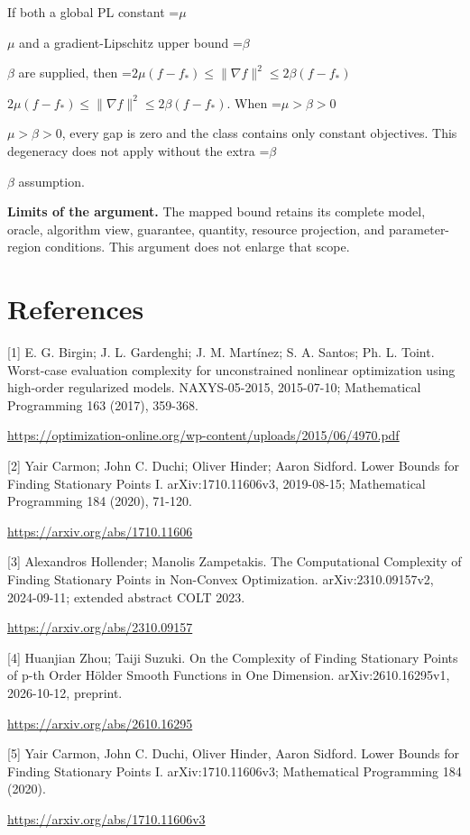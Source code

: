 \documentclass[10pt,a4paper]{article}
\newcommand{\AtlasMath}[1]{\par\begingroup\centering\setbox0=\hbox{$\displaystyle #1$}\ifdim\wd0>1.4\linewidth\typeout{ATLAS WIDE FORMULA: \the\wd0}\fi\ifdim\wd0>\linewidth\resizebox{\linewidth}{!}{\box0}\else\box0\fi\par\endgroup}
\newcommand{\AtlasInlineMath}[1]{\begingroup\setbox0=\hbox{$#1$}\ifdim\wd0>.4\linewidth\endgroup\AtlasMath{#1}\else\endgroup$#1$\fi}
\begin{document}
If both a global PL constant \AtlasInlineMath{\mu} and a gradient-Lipschitz upper bound \AtlasInlineMath{\beta} are supplied, then \AtlasInlineMath{2\mu(f-f_*)\le\|\nabla f\|^2\le2\beta(f-f_*)}. When \AtlasInlineMath{\mu>\beta>0}, every gap is zero and the class contains only constant objectives. This degeneracy does not apply without the extra \AtlasInlineMath{\beta} assumption.

\textbf{Limits of the argument.} The mapped bound retains its complete model, oracle, algorithm view, guarantee, quantity, resource projection, and parameter-region conditions. This argument does not enlarge that scope.

\section{References}
[1] E. G. Birgin; J. L. Gardenghi; J. M. Martínez; S. A. Santos; Ph. L. Toint. Worst-case evaluation complexity for unconstrained nonlinear optimization using high-order regularized models. NAXYS-05-2015, 2015-07-10; Mathematical Programming 163 (2017), 359-368.

\url{https://optimization-online.org/wp-content/uploads/2015/06/4970.pdf}

[2] Yair Carmon; John C. Duchi; Oliver Hinder; Aaron Sidford. Lower Bounds for Finding Stationary Points I. arXiv:1710.11606v3, 2019-08-15; Mathematical Programming 184 (2020), 71-120.

\url{https://arxiv.org/abs/1710.11606}

[3] Alexandros Hollender; Manolis Zampetakis. The Computational Complexity of Finding Stationary Points in Non-Convex Optimization. arXiv:2310.09157v2, 2024-09-11; extended abstract COLT 2023.

\url{https://arxiv.org/abs/2310.09157}

[4] Huanjian Zhou; Taiji Suzuki. On the Complexity of Finding Stationary Points of p-th Order Hölder Smooth Functions in One Dimension. arXiv:2610.16295v1, 2026-10-12, preprint.

\url{https://arxiv.org/abs/2610.16295}

[5] Yair Carmon, John C. Duchi, Oliver Hinder, Aaron Sidford. Lower Bounds for Finding Stationary Points I. arXiv:1710.11606v3; Mathematical Programming 184 (2020).

\url{https://arxiv.org/abs/1710.11606v3}
\end{document}
